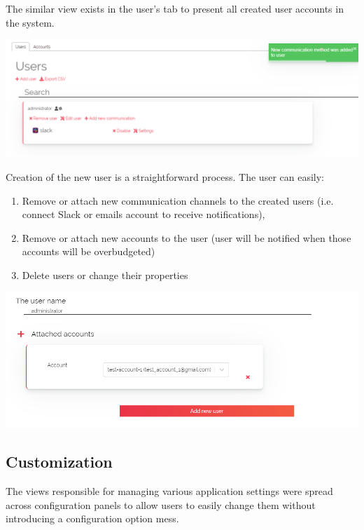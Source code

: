 \documentclass[licencjacka,en]{thesisclass}
\begin{document}
    The similar view exists in the user's tab to present all created user accounts in the system.
    
    \includegraphics[width=\textwidth] {imgs/screenshots/screen_users_browse.png}
    
    Creation of the new user is a straightforward process. The user can easily:
    \begin{enumerate}
        \item Remove or attach new communication channels
          to the created users (i.e. connect Slack or emails account to receive notifications),
        \item Remove or attach new accounts to the user
          (user will be notified when those accounts will be overbudgeted)
        \item Delete users or change their properties
    \end{enumerate}
    
    \includegraphics[width=\textwidth] {imgs/screenshots/screen_users_create.png}
    
    \subsection{Customization}
    
    The views responsible for managing various application settings
    were spread across configuration panels to allow users to easily change
    them without introducing a configuration option mess.
    
\end{document}
